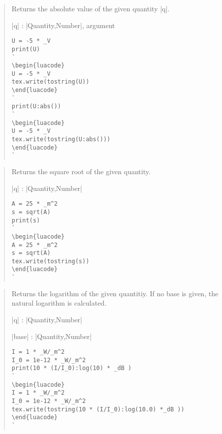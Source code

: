 \documentclass{ltxdoc}
\begin{document}
\begin{quote}
  Returns the absolute value of the given quantity |q|.

  \begin{description}
  \item |q| : |Quantity,Number|, argument
  \end{description}


\begin{lstlisting}
U = -5 * _V
print(U)
`
\begin{luacode}
U = -5 * _V
tex.write(tostring(U))
\end{luacode}
`
print(U:abs())
`
\begin{luacode}
U = -5 * _V
tex.write(tostring(U:abs()))
\end{luacode}
`
\end{lstlisting}
\end{quote}




\begin{quote}
  Returns the square root of the given quantity.

  \begin{description}
  \item |q| : |Quantity,Number|
  \end{description}


\begin{lstlisting}
A = 25 * _m^2
s = sqrt(A)
print(s)
`
\begin{luacode}
A = 25 * _m^2
s = sqrt(A)
tex.write(tostring(s))
\end{luacode}
`
\end{lstlisting}
\end{quote}



\begin{quote}
  Returns the logarithm of the given quantitiy. If no base is given, the natural logarithm is calculated.

  \begin{description}
  \item |q| : |Quantity,Number|
  \item |base| : |Quantity,Number|
  \end{description}


\begin{lstlisting}
I = 1 * _W/_m^2
I_0 = 1e-12 * _W/_m^2
print(10 * (I/I_0):log(10) * _dB )
`
\begin{luacode}
I = 1 * _W/_m^2
I_0 = 1e-12 * _W/_m^2
tex.write(tostring(10 * (I/I_0):log(10.0) *_dB ))
\end{luacode}
`
\end{lstlisting}
\end{quote}
\end{document}
